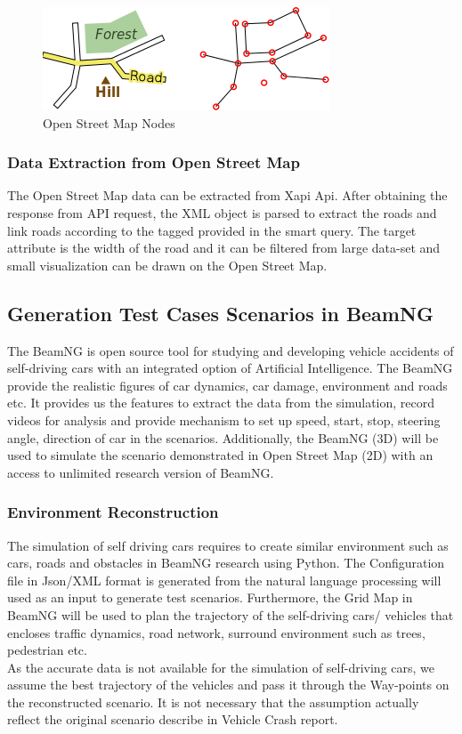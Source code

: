 \begin{figure}[H]
\centering
  \includegraphics[scale= 0.7]{pictures/nodes-and-ways.png}
  \caption{Open Street Map Nodes}
\end{figure}

\subsubsection{Data Extraction from Open Street Map}
The Open Street Map\cite{haklay2008openstreetmap} data can be extracted from Xapi Api. After obtaining the response from API request, the XML object is parsed to extract the roads and link roads according to the tagged provided in the smart query. The target attribute is the width of the road and it can be filtered from large data-set and small visualization can be drawn on the Open Street Map. 

\subsection{Generation Test Cases Scenarios in BeamNG}
The BeamNG is open source tool for studying and developing vehicle accidents of self-driving cars with an integrated option of Artificial Intelligence. The BeamNG provide the realistic figures of car dynamics, car damage, environment and roads etc. It provides us the features to extract the data from the simulation, record videos for analysis and provide mechanism to set up speed, start, stop, steering angle, direction of car in the scenarios. Additionally, the BeamNG (3D) will be used to simulate the scenario demonstrated in Open Street Map (2D) with an access to unlimited research version of BeamNG.  
 
\subsubsection{Environment Reconstruction}
The simulation of self driving cars requires to create similar environment such as cars, roads and obstacles in BeamNG research using Python. The Configuration file in Json/XML format is generated from the natural language processing will used as an input to generate test scenarios. Furthermore, the Grid Map in BeamNG will be used to plan the trajectory of the self-driving cars/ vehicles that encloses traffic dynamics, road network, surround environment such as trees, pedestrian etc. \\
As the accurate data is not available for the simulation of self-driving cars, we assume the best trajectory of the vehicles and pass it through the Way-points on the reconstructed scenario. It is not necessary that the assumption actually reflect the original scenario describe in Vehicle Crash report.

